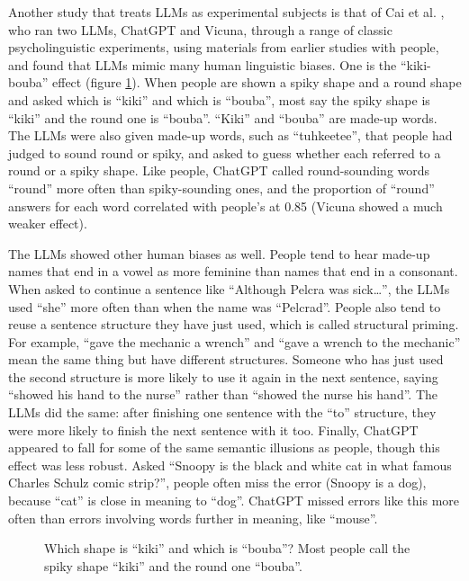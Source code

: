 Another study that treats LLMs as experimental subjects is that of Cai et al.
\cite{cai2023do}, who ran two LLMs, ChatGPT and Vicuna, through a range of classic psycholinguistic
experiments, using materials from earlier studies with people, and found that
LLMs mimic many human linguistic biases. One is the ``kiki-bouba'' effect
(figure \ref{kikiBouba}). When people are shown a spiky shape and a round shape
and asked which is ``kiki'' and which is ``bouba'', most say the spiky shape is
``kiki'' and the round one is ``bouba''. ``Kiki'' and ``bouba'' are made-up
words. The LLMs were also given made-up words, such as ``tuhkeetee'', that
people had judged to sound round or spiky, and asked to guess whether each
referred to a round or a spiky shape. Like people, ChatGPT called round-sounding
words ``round'' more often than spiky-sounding ones, and the
proportion of ``round'' answers for each word correlated with people's at 0.85
(Vicuna showed a much weaker effect).

The LLMs showed other human biases as well. People tend to hear made-up names
that end in a vowel as more feminine than names that end in a consonant. When
asked to continue a sentence like ``Although Pelcra was sick\ldots'', the LLMs
used ``she'' more often than when the name was ``Pelcrad''. People also tend to
reuse a sentence structure they have just used, which is called structural
priming. For example, ``gave the mechanic a wrench'' and ``gave a wrench to the
mechanic'' mean the same thing but have different structures. Someone who has
just used the second structure is more likely to use it again in the next
sentence, saying ``showed his hand to the nurse'' rather than ``showed the
nurse his hand''. The LLMs did the same: after finishing one sentence with the
``to'' structure, they were more likely to finish the next sentence with it
too. Finally, ChatGPT appeared to fall for some of the same semantic illusions as
people, though this effect was less robust. Asked ``Snoopy is the black and white cat in what famous Charles Schulz
comic strip?'', people often miss the error (Snoopy is a dog), because ``cat''
is close in meaning to ``dog''. ChatGPT missed errors like this more often than
errors involving words further in meaning, like ``mouse''.

\begin{figure}[htbp]
\centering
{}
\caption[Jeff Yoshimi.]{Which shape is ``kiki'' and which is ``bouba''? Most people call the spiky shape ``kiki'' and the round one ``bouba''.}
\label{kikiBouba}
\end{figure}

